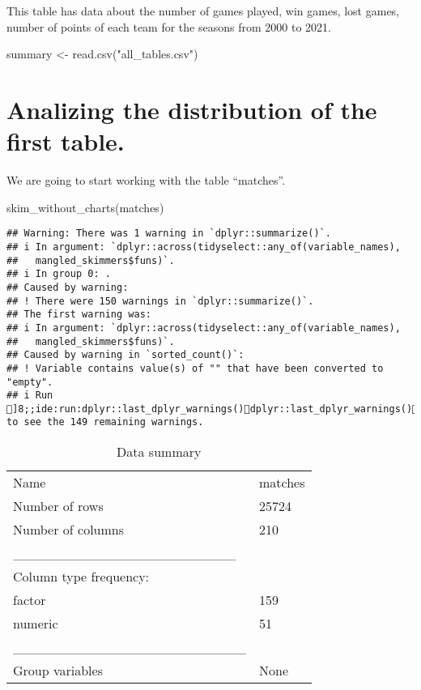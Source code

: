 \documentclass[
]{article}
\newenvironment{Shaded}{\begin{snugshade}}{\end{snugshade}}
\newcommand{\FunctionTok}[1]{\textcolor[rgb]{0.00,0.00,0.00}{#1}}
\newcommand{\NormalTok}[1]{#1}
\newcommand{\OtherTok}[1]{\textcolor[rgb]{0.56,0.35,0.01}{#1}}
\newcommand{\StringTok}[1]{\textcolor[rgb]{0.31,0.60,0.02}{#1}}
\begin{document}
This table has data about the number of games played, win games, lost
games, number of points of each team for the seasons from 2000 to 2021.

\begin{Shaded}
\begin{Highlighting}[]
\NormalTok{summary }\OtherTok{\textless{}{-}} \FunctionTok{read.csv}\NormalTok{(}\StringTok{"all\_tables.csv"}\NormalTok{)}
\end{Highlighting}
\end{Shaded}

\hypertarget{analizing-the-distribution-of-the-first-table.}{%
\section{Analizing the distribution of the first
table.}\label{analizing-the-distribution-of-the-first-table.}}

We are going to start working with the table ``matches''.

\begin{Shaded}
\begin{Highlighting}[]
 \FunctionTok{skim\_without\_charts}\NormalTok{(matches) }
\end{Highlighting}
\end{Shaded}

\begin{verbatim}
## Warning: There was 1 warning in `dplyr::summarize()`.
## i In argument: `dplyr::across(tidyselect::any_of(variable_names),
##   mangled_skimmers$funs)`.
## i In group 0: .
## Caused by warning:
## ! There were 150 warnings in `dplyr::summarize()`.
## The first warning was:
## i In argument: `dplyr::across(tidyselect::any_of(variable_names),
##   mangled_skimmers$funs)`.
## Caused by warning in `sorted_count()`:
## ! Variable contains value(s) of "" that have been converted to "empty".
## i Run ]8;;ide:run:dplyr::last_dplyr_warnings()dplyr::last_dplyr_warnings()]8;; to see the 149 remaining warnings.
\end{verbatim}

\begin{longtable}[]{@{}ll@{}}
\caption{Data summary}\tabularnewline
\toprule()
\endhead
Name & matches \\
Number of rows & 25724 \\
Number of columns & 210 \\
\_\_\_\_\_\_\_\_\_\_\_\_\_\_\_\_\_\_\_\_\_\_\_ & \\
Column type frequency: & \\
factor & 159 \\
numeric & 51 \\
\_\_\_\_\_\_\_\_\_\_\_\_\_\_\_\_\_\_\_\_\_\_\_\_ & \\
Group variables & None \\
\bottomrule()
\end{longtable}
\end{document}
